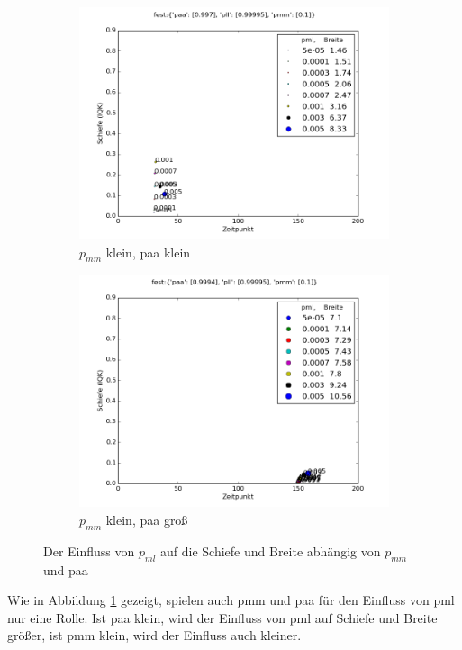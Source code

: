 \begin{figure}
\begin{subfigure}[b]{0.5\textwidth}
\includegraphics[width=\textwidth]{bilder/pml/pml_01_p_0997_099995}
\caption{$p_{mm}$ klein, paa klein}
\end{subfigure}
\begin{subfigure}[b]{0.5\textwidth}
\includegraphics[width=\textwidth]{bilder/pml/pml_01_p_09994_099995}
\caption{$p_{mm}$ klein, paa groß}
\end{subfigure}
\caption{Der Einfluss von $p_{ml}$ auf die Schiefe und Breite abhängig von $p_{mm}$ und paa}
\label{einfluss_pml_2}
\end{figure}

Wie in Abbildung \ref{einfluss_pml_2} gezeigt, spielen auch pmm und paa für den Einfluss von pml nur eine  Rolle. Ist paa klein, wird der Einfluss von pml auf Schiefe und Breite größer, ist pmm klein, wird der Einfluss auch kleiner.


